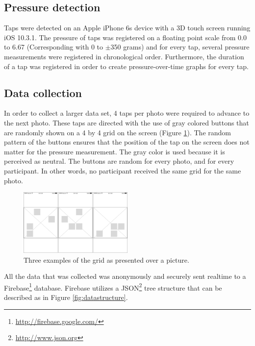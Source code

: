 \documentclass{sig-alternate}
\begin{document}

\subsection{Pressure detection} %
\label{sub:pressure_detection}
Taps were detected on an Apple iPhone 6s device with a 3D touch screen running iOS 10.3.1. The pressure of taps was registered on a floating point scale from 0.0 to 6.67 (Corresponding with 0 to $\pm$350 grams) and for every tap, several pressure measurements were registered in chronological order. Furthermore, the duration of a tap was registered in order to create pressure-over-time graphs for every tap.

\subsection{Data collection} %
\label{sub:data_collection}
In order to collect a larger data set, 4 taps per photo were required to advance to the next photo. These taps are directed with the use of gray colored buttons that are randomly shown on a 4 by 4 grid on the screen (Figure \ref{fig:grid}). The random pattern of the buttons ensures that the position of the tap on the screen does not matter for the pressure measurement. The gray color is used because it is perceived as neutral. The buttons are random for every photo, and for every participant. In other words, no participant received the same grid for the same photo.
\begin{figure}[h]
    \centering
    \includegraphics[width=0.5\textwidth]{images/Grid.png}
    \caption{Three examples of the grid as presented over a picture.}
    \label{fig:grid}
\end{figure}

All the data that was collected was anonymously and securely sent realtime to a Firebase\footnote{\url{http://firebase.google.com/}} database. Firebase utilizes a JSON\footnote{\url{http://www.json.org}} tree structure that can be described as in Figure \ref{fig:datastructure}.
\end{document}
